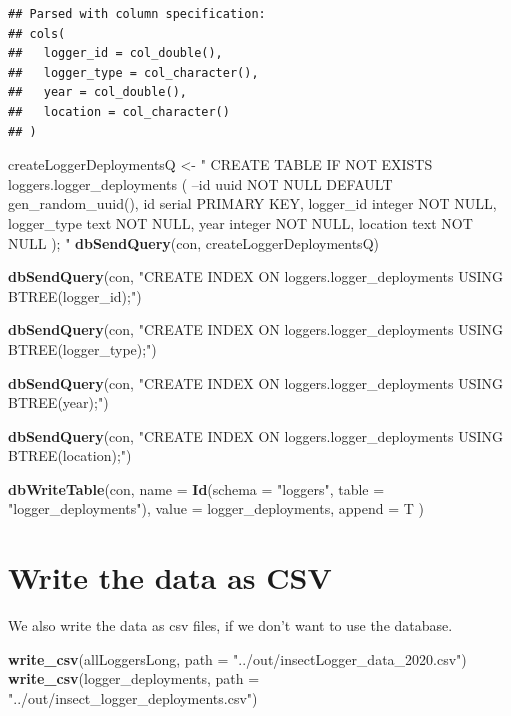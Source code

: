 \documentclass[]{article}
\newenvironment{Shaded}{\begin{snugshade}}{\end{snugshade}}
\newcommand{\DataTypeTok}[1]{\textcolor[rgb]{0.13,0.29,0.53}{#1}}
\newcommand{\KeywordTok}[1]{\textcolor[rgb]{0.13,0.29,0.53}{\textbf{#1}}}
\newcommand{\NormalTok}[1]{#1}
\newcommand{\StringTok}[1]{\textcolor[rgb]{0.31,0.60,0.02}{#1}}
\begin{document}
\begin{verbatim}
## Parsed with column specification:
## cols(
##   logger_id = col_double(),
##   logger_type = col_character(),
##   year = col_double(),
##   location = col_character()
## )
\end{verbatim}

\begin{Shaded}
\begin{Highlighting}[]
\NormalTok{createLoggerDeploymentsQ <-}\StringTok{ "}
\StringTok{CREATE TABLE IF NOT EXISTS loggers.logger_deployments (}
\StringTok{--id uuid NOT NULL DEFAULT gen_random_uuid(),}
\StringTok{id serial PRIMARY KEY,}
\StringTok{logger_id integer NOT NULL,}
\StringTok{logger_type text NOT NULL,}
\StringTok{year integer NOT NULL,}
\StringTok{location text NOT NULL}
\StringTok{);}
\StringTok{"}
\KeywordTok{dbSendQuery}\NormalTok{(con, createLoggerDeploymentsQ)}

\KeywordTok{dbSendQuery}\NormalTok{(con,}
            \StringTok{"CREATE INDEX ON loggers.logger_deployments USING BTREE(logger_id);"}\NormalTok{)}

\KeywordTok{dbSendQuery}\NormalTok{(con,}
            \StringTok{"CREATE INDEX ON loggers.logger_deployments USING BTREE(logger_type);"}\NormalTok{)}

\KeywordTok{dbSendQuery}\NormalTok{(con,}
            \StringTok{"CREATE INDEX ON loggers.logger_deployments USING BTREE(year);"}\NormalTok{)}

\KeywordTok{dbSendQuery}\NormalTok{(con,}
            \StringTok{"CREATE INDEX ON loggers.logger_deployments USING BTREE(location);"}\NormalTok{)}
\end{Highlighting}
\end{Shaded}

\begin{Shaded}
\begin{Highlighting}[]
\KeywordTok{dbWriteTable}\NormalTok{(con,}
             \DataTypeTok{name =} \KeywordTok{Id}\NormalTok{(}\DataTypeTok{schema =} \StringTok{"loggers"}\NormalTok{, }\DataTypeTok{table =} \StringTok{"logger_deployments"}\NormalTok{),}
             \DataTypeTok{value =}\NormalTok{ logger_deployments,}
             \DataTypeTok{append =}\NormalTok{ T}
\NormalTok{             )}
\end{Highlighting}
\end{Shaded}

\hypertarget{write-the-data-as-csv}{%
\section{Write the data as CSV}\label{write-the-data-as-csv}}

We also write the data as csv files, if we don't want to use the
database.

\begin{Shaded}
\begin{Highlighting}[]
\KeywordTok{write_csv}\NormalTok{(allLoggersLong, }\DataTypeTok{path =} \StringTok{"../out/insectLogger_data_2020.csv"}\NormalTok{)}
\KeywordTok{write_csv}\NormalTok{(logger_deployments, }\DataTypeTok{path =} \StringTok{"../out/insect_logger_deployments.csv"}\NormalTok{)}
\end{Highlighting}
\end{Shaded}
\end{document}
